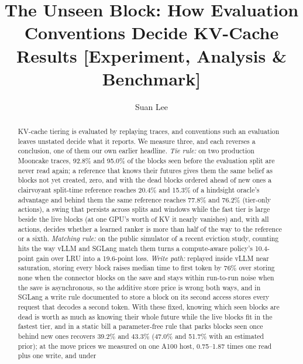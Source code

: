 \documentclass[sigconf, nonacm]{acmart}
\begin{document}
\title[The Unseen Block: How Evaluation Conventions Decide KV-Cache Results]{The Unseen
Block: How Evaluation Conventions Decide KV-Cache Results [Experiment, Analysis \& Benchmark]}

\author{Suan Lee}

\begin{abstract}
KV-cache tiering is evaluated by replaying traces, and conventions such an evaluation leaves unstated decide
what it reports. We measure three, and each reverses a conclusion, one of them our own earlier headline. \emph{Tie rule:} on two production Mooncake
traces, 92.8\% and 95.0\% of the blocks seen before the evaluation split are never read again; a reference that
knows their futures gives them the same belief as blocks not yet created, zero, and with the dead blocks ordered
ahead of new ones a clairvoyant split-time reference reaches 20.4\% and 15.3\% of a hindsight oracle's
advantage and behind them the same reference reaches 77.8\% and 76.2\% (tier-only actions), a swing that persists across splits and windows
while the fast tier is large beside the live blocks (at one GPU's worth of KV it nearly vanishes) and, with all
actions, decides whether a learned ranker is more than half of the way to the reference or a
sixth. \emph{Matching rule:} on the public simulator of a recent eviction study, counting hits the way vLLM and
SGLang match them turns a compute-aware policy's 10.4-point gain over LRU into a 19.6-point loss. \emph{Write
path:} replayed inside vLLM near saturation, storing every block raises median time to first token by 76\% over
storing none when the connector blocks on the save and stays within run-to-run noise when the save is
asynchronous, so the additive store price is wrong both ways, and in SGLang a write rule documented to store a
block on its second access stores every request that decodes a second token. With these fixed, knowing which seen blocks are dead is worth as
much as knowing their whole future while the live blocks fit in the fastest tier, and in a static bill a parameter-free
rule that parks blocks seen once behind new ones recovers 39.2\% and 43.3\% (47.0\% and 51.7\% with an estimated
prior); at the move prices we measured on one A100 host, 0.75--1.87 times one read plus one write, and under

\end{abstract}
\end{document}
